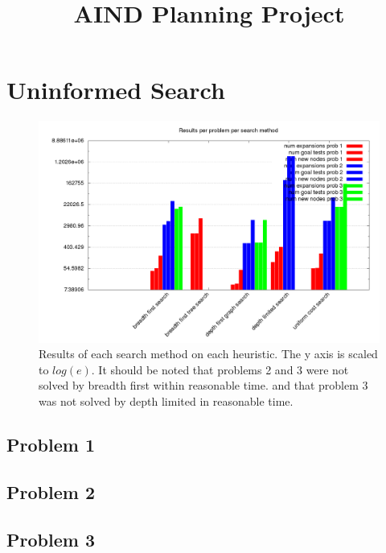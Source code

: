 \documentclass[11pt]{article}
\title{\textbf{AIND Planning Project}}
\begin{document}
\maketitle

\newpage

\section{Uninformed Search}




    {}%
\begin{figure}
	\includegraphics[scale=0.32]{results_summary.png}
	\caption{Results of each search method on each heuristic. The y axis is scaled to $log(e)$.
			 It should be noted that problems 2 and 3 were not solved by breadth first within reasonable time. and that problem 3 was not solved by depth limited in reasonable time.}
	\label{results}
\end{figure}



\subsection{Problem 1}

\subsection{Problem 2}

\subsection{Problem 3}
\end{document}
